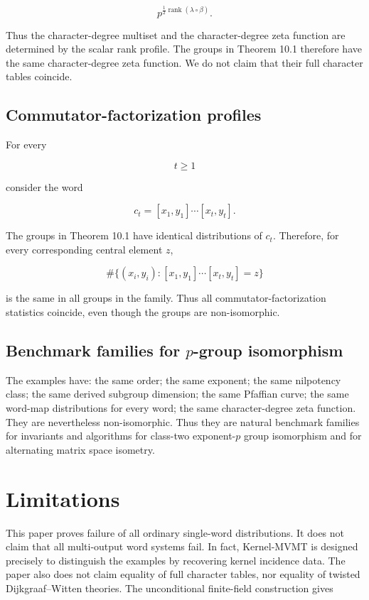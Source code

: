 \documentclass[11pt]{article}
\begin{document}
\[
p^{\frac12\operatorname{rank}(\lambda\circ\beta)}.
\]

Thus the character-degree multiset and the character-degree zeta function are determined by the scalar rank profile. The groups in Theorem 10.1 therefore have the same character-degree zeta function. We do not claim that their full character tables coincide.

\subsection{Commutator-factorization profiles}

For every

\[
t\ge1
\]

consider the word

\[
c_t=[x_1,y_1]\cdots[x_t,y_t].
\]

The groups in Theorem 10.1 have identical distributions of $c_t$. Therefore, for every corresponding central element $z$,

\[
\#\{(x_i,y_i):[x_1,y_1]\cdots[x_t,y_t]=z\}
\]

is the same in all groups in the family. Thus all commutator-factorization statistics coincide, even though the groups are non-isomorphic.

\subsection{Benchmark families for $p$-group isomorphism}

The examples have: the same order; the same exponent; the same nilpotency class; the same derived subgroup dimension; the same Pfaffian curve; the same word-map distributions for every word; the same character-degree zeta function. They are nevertheless non-isomorphic. Thus they are natural benchmark families for invariants and algorithms for class-two exponent-$p$ group isomorphism and for alternating matrix space isometry.

\section{Limitations}

This paper proves failure of all ordinary single-word distributions. It does not claim that all multi-output word systems fail. In fact, Kernel-MVMT is designed precisely to distinguish the examples by recovering kernel incidence data. The paper also does not claim equality of full character tables, nor equality of twisted Dijkgraaf--Witten theories. The unconditional finite-field construction gives
\end{document}
